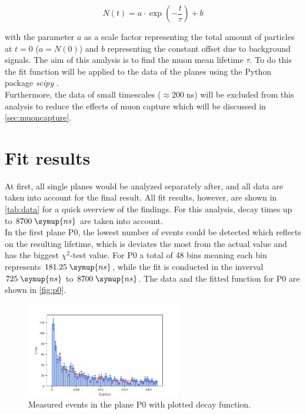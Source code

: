 \begin{equation}
    N(t) = a \cdot \exp\left(- \frac{t}{\tau}\right) + b 
    \label{eqn:fit}
\end{equation}

with the parameter $a$ as a scale factor representing the total amount of particles at $t=0$ ($ a = N(0)$)
and $b$ representing the constant offset due to background signals. The aim of this analysis is to 
find the muon mean lifetime $\tau$. To do this the fit function will be applied to the data of the planes 
using the Python package \textit{scipy} \cite{scipy}.\\
Furthermore, the data of small timescales ($\approx 200\;$ns) will be excluded from this analysis
to reduce the effects of muon capture 
which will be discussed in \autoref{sec:muoncapture}.

\section{Fit results}

At first, all single planes would be analyzed separately after, and all data are taken into account for the final result. All fit results, however, are shown in 
\autoref{tab:data} for a quick overview of the findings. For this analysis, 
decay times up to $8700 \; \symup{ns}$ are taken into account.\\
In the first plane P0, the lowest number of events could be detected which reflects on the resulting lifetime, which is deviates the most from the actual value and has the biggest $\chi^2$-test value.
For P0 a total of 48 bins meaning each bin represents $181.25 \; \symup{ns}$, while the fit is conducted in the inverval $725 \; \symup{ns}$ to $8700 \; \symup{ns}$.
The data and the fitted function for P0 are shown in \autoref{fig:p0}.\\
\begin{figure}
    \centering
    \includegraphics[width=0.6\textwidth]{plots/p0.pdf}
    \caption{Measured events in the plane P0 with plotted decay function.}
    \label{fig:p0}
\end{figure}


